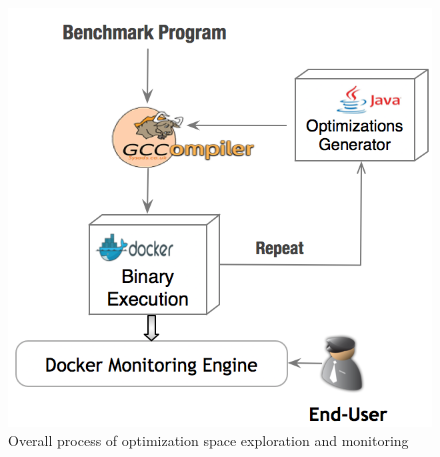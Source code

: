 \begin{figure}[h]
	\centering
	\includegraphics[scale=0.50]{Ressources/infra_novelty.png}
	\caption{Overall process of optimization space exploration and monitoring}
\end{figure}


